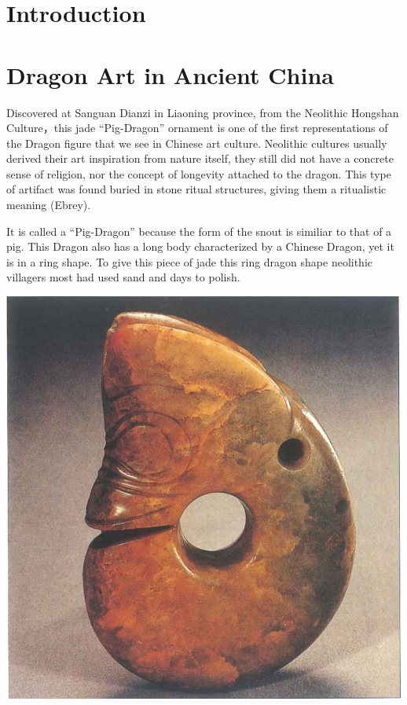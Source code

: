 \documentclass[
]{book}
\begin{document}
\hypertarget{intro}{%
\chapter*{Introduction}\label{intro}}

\hypertarget{ancient}{%
\chapter*{Dragon Art in Ancient China}\label{ancient}}

Discovered at Sanguan Dianzi in Liaoning province, from the Neolithic Hongshan Culture，this jade ``Pig-Dragon'' ornament is one of the first representations of the Dragon figure that we see in Chinese art culture. Neolithic cultures usually derived their art inspiration from nature itself, they still did not have a concrete sense of religion, nor the concept of longevity attached to the dragon. This type of artifact was found buried in stone ritual structures, giving them a ritualistic meaning (Ebrey).

It is called a ``Pig-Dragon'' because the form of the snout is similiar to that of a pig. This Dragon also has a long body characterized by a Chinese Dragon, yet it is in a ring shape. To give this piece of jade this ring dragon shape neolithic villagers most had used sand and days to polish.

\includegraphics[width=\textwidth,height=0.35\textheight]{images/Jade_Pig_Dragon.png}
\end{document}
